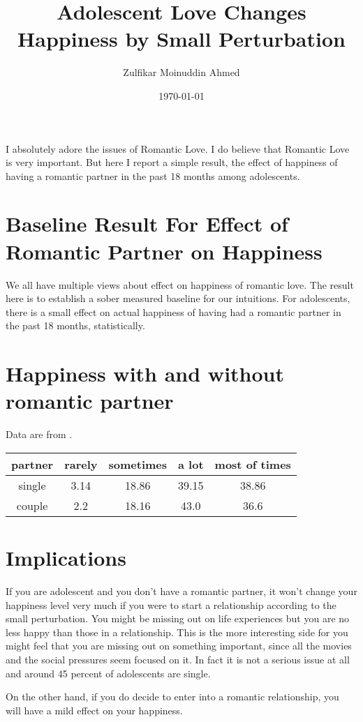 \documentclass{amsart}
\title{Adolescent Love Changes Happiness by Small Perturbation}
\author{Zulfikar Moinuddin Ahmed}
\date{\today}
\begin{document}
\maketitle
I absolutely adore the issues of Romantic Love.  I do believe that Romantic Love is very important.  But here I report a simple result, the effect of happiness of having a romantic partner in the past 18 months among adolescents.  

\section{Baseline Result For Effect of Romantic Partner on Happiness}

We all have multiple views about effect on happiness of romantic love.  The result here is to establish a sober measured baseline for our intuitions.  For adolescents, there is a small effect on actual happiness of having had a romantic partner in the past 18 months, statistically.  

\section{Happiness with and without romantic partner}

Data are from \cite{AH}.

\begin{center}
\begin{tabular} { | c | c | c | c | c |}
 \hline
  partner & rarely & sometimes & a lot & most of times \\
 \hline
 single & 3.14 & 18.86 & 39.15 & 38.86  \\
\hline
 couple & 2.2 & 18.16 & 43.0 & 36.6  \\
\hline
\end{tabular}
\end{center}

\section{Implications}

If you are adolescent and you don't have a romantic partner, it won't change your happiness level very much if you were to start a relationship according to the small perturbation.  You might be missing out on life experiences but you are no less happy than those in a relationship.  This is the more interesting side for you might feel that you are missing out on something important, since all the movies and the social pressures seem focused on it.  In fact it is not a serious issue at all and around 45 percent of adolescents are single.

On the other hand, if you do decide to enter into a romantic relationship, you will have a mild effect on your happiness.

\begin{thebibliography}{CCC}
\end{thebibliography}
\end{document}
